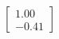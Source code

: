 \documentclass[preview]{standalone}
\begin{document}
\begin{align*}
\begin{bmatrix} 1.00 \\ -0.41 \end{bmatrix}
\end{align*}
\end{document}
